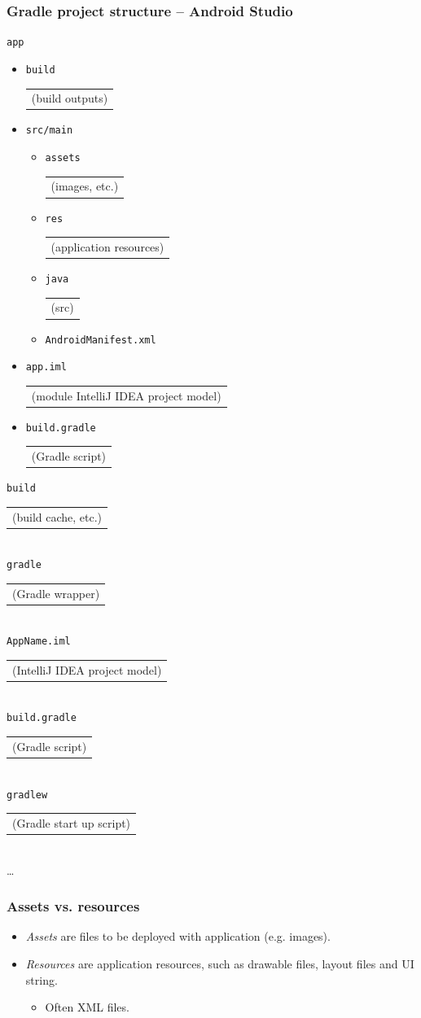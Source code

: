 \documentclass[10pt,xcolor=pdflatex]{beamer}
\newcommand{\tabright}[2]{\dotfill\begin{tabular}[t]{l}{#1}\hspace*{#2}\end{tabular}}
\begin{document}
\begin{frame}[fragile]\frametitle{Gradle project structure -- Android Studio}
    \def\twidth{1.5cm}
    \texttt{app}
	\begin{itemize}
      \item \texttt{build} \tabright{(build outputs)}{\twidth}
      \item \texttt{src/main}
        \begin{itemize}
          \item \texttt{assets} \tabright{(images, etc.)}{\twidth}
          \item \texttt{res} \tabright{(application resources)}{\twidth}
          \item \texttt{java} \tabright{(src)}{\twidth}
          \item \texttt{AndroidManifest.xml}
        \end{itemize}
      \item \texttt{app.iml} \tabright{(module IntelliJ IDEA project model)}{\twidth}
      \item \texttt{build.gradle} \tabright{(Gradle script)}{\twidth}
    \end{itemize}
    \texttt{build} \tabright{(build cache, etc.)}{\twidth}\\
    \texttt{gradle}  \tabright{(Gradle wrapper)}{\twidth}\\
    \texttt{AppName.iml} \tabright{(IntelliJ IDEA project model)}{\twidth}\\
    \texttt{build.gradle} \tabright{(Gradle script)}{\twidth}\\
    \texttt{gradlew} \tabright{(Gradle start up script)}{\twidth}\\
    \ldots
{}
\end{frame}

\begin{frame}\frametitle{Assets vs. resources}
	\begin{itemize}
	  \item \emph{Assets} are files to be deployed with application (e.g. images).
	  \item \emph{Resources} are application resources, such as drawable files, layout files and UI string.
	    \begin{itemize}
	        \item Often XML files.
	    \end{itemize}
    \end{itemize}
\end{frame}
\end{document}
